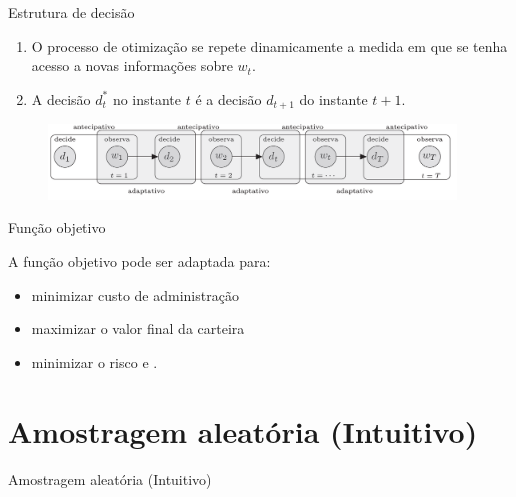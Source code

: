 \documentclass{beamer}
\begin{document}
\begin{frame}{Estrutura de decisão}

\begin{enumerate}
\item O processo de otimização se repete dinamicamente a medida em que se tenha acesso a novas informações sobre $w_t$. 
\item A decisão $d_t^{*}$ no instante $t$ é a decisão $d_{t+1}$ do instante $t+1$.
\end{enumerate}

\begin{figure}
\begin{center}
 \includegraphics[height=2cm,keepaspectratio]{processo_adapt_antecipa.png}
 \end{center}
\label{fig:atcpt}
\end{figure}

\end{frame}







\begin{frame}{Função objetivo}


A função objetivo pode ser adaptada para:

\begin{itemize}
\item minimizar custo de administração \citep{Kouwenberg2008}
\item maximizar o valor final da carteira \citep{Johannes2014}
\item minimizar o risco \citep{Ferstl2011} e \citep{Quaranta2008}.
\end{itemize}

\end{frame}



\section{Amostragem aleatória (Intuitivo)}

\begin{frame}{ }
    \begin{block}{ }
      \Huge  Amostragem aleatória (Intuitivo)
    \end{block}
\end{frame}
\end{document}
